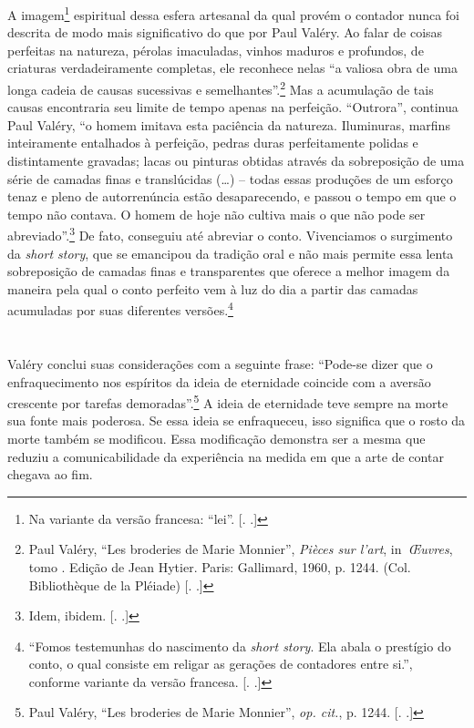 A imagem\footnote{Na variante da versão francesa: ``lei''. [. 
.]} espiritual dessa esfera artesanal da qual provém o contador
nunca foi descrita de modo mais significativo do que por Paul Valéry. Ao
falar de coisas perfeitas na natureza, pérolas imaculadas, vinhos
maduros e profundos, de criaturas verdadeiramente completas, ele
reconhece nelas ``a valiosa obra de uma longa cadeia de causas
sucessivas e semelhantes''.\footnote{Paul Valéry, ``Les broderies de
  Marie Monnier'', \emph{Pièces sur l'art}, in~\emph{Œuvres}, tomo .
  Edição de Jean Hytier. Paris: Gallimard, 1960, p. 1244. (Col.
  Bibliothèque de la Pléiade) [. .]} Mas a acumulação de tais
causas encontraria seu limite de tempo apenas na perfeição. ``Outrora'',
continua Paul Valéry, ``o homem imitava esta paciência da natureza.
Iluminuras, marfins inteiramente entalhados à perfeição, pedras duras
perfeitamente polidas e distintamente gravadas; lacas ou pinturas
obtidas através da sobreposição de uma série de camadas finas e
translúcidas (\ldots{}) -- todas essas produções de um esforço tenaz e pleno
de autorrenúncia estão desaparecendo, e passou o tempo em que o tempo
não contava. O homem de hoje não cultiva mais o que não pode ser
abreviado''.\footnote{Idem, ibidem. [. .]} De fato, conseguiu
até abreviar o conto. Vivenciamos o surgimento da \emph{short story},
que se emancipou da tradição oral e não mais permite essa lenta
sobreposição de camadas finas e transparentes que oferece a melhor
imagem da maneira pela qual o conto perfeito vem à luz do dia a partir
das camadas acumuladas por suas diferentes versões\label{supra7}.\footnote{``Fomos
  testemunhas do nascimento da \emph{short story}. Ela abala o prestígio
  do conto, o qual consiste em religar as gerações de contadores entre
  si.'', conforme variante da versão francesa. [. .]}

\section{}

Valéry conclui suas considerações com a seguinte frase: ``Pode-se dizer
que o enfraquecimento nos espíritos da ideia de eternidade coincide com
a aversão crescente por tarefas demoradas''.\footnote{Paul Valéry, ``Les
  broderies de Marie Monnier'', \emph{op. cit.}, p. 1244. [. .]}
A ideia de eternidade teve sempre na morte sua fonte mais poderosa. Se
essa ideia se enfraqueceu, isso significa que o rosto da morte também se
modificou. Essa modificação demonstra ser a mesma que reduziu a
comunicabilidade da experiência na medida em que a arte de contar
chegava ao fim.

